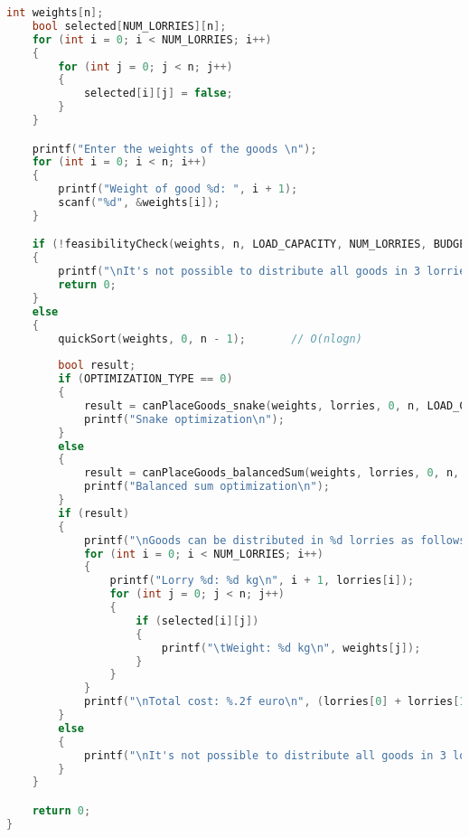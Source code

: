 \documentclass{article}
\begin{document}
\begin{lstlisting}[language=C++, caption=Implementation in C of PseudoCode \ref{algo:main}., label=lst:code1]
    int weights[n];
    bool selected[NUM_LORRIES][n];
    for (int i = 0; i < NUM_LORRIES; i++)
    {
        for (int j = 0; j < n; j++)
        {
            selected[i][j] = false;
        }
    }

    printf("Enter the weights of the goods \n");
    for (int i = 0; i < n; i++)
    {
        printf("Weight of good %d: ", i + 1);
        scanf("%d", &weights[i]);
    }

    if (!feasibilityCheck(weights, n, LOAD_CAPACITY, NUM_LORRIES, BUDGET, COST_PER_KG))
    {
        printf("\nIt's not possible to distribute all goods in 3 lorries without exceeding the capacity of 20 Tm each.\n");
        return 0;
    }
    else
    {
        quickSort(weights, 0, n - 1);       // O(nlogn)
        
        bool result;
        if (OPTIMIZATION_TYPE == 0)
        {
            result = canPlaceGoods_snake(weights, lorries, 0, n, LOAD_CAPACITY, selected); // O(3^n)
            printf("Snake optimization\n");
        }
        else
        {
            result = canPlaceGoods_balancedSum(weights, lorries, 0, n, LOAD_CAPACITY, selected); // O(3^n)
            printf("Balanced sum optimization\n");
        }
        if (result)
        {
            printf("\nGoods can be distributed in %d lorries as follows:\n", NUM_LORRIES);
            for (int i = 0; i < NUM_LORRIES; i++)
            {
                printf("Lorry %d: %d kg\n", i + 1, lorries[i]);
                for (int j = 0; j < n; j++)
                {
                    if (selected[i][j])
                    {
                        printf("\tWeight: %d kg\n", weights[j]);
                    }
                }
            }
            printf("\nTotal cost: %.2f euro\n", (lorries[0] + lorries[1] + lorries[2]) * COST_PER_KG);
        }
        else
        {
            printf("\nIt's not possible to distribute all goods in 3 lorries without exceeding the capacity of 20 Tm each.\n");
        }
    }

    return 0;
}
\end{lstlisting}
\end{document}
